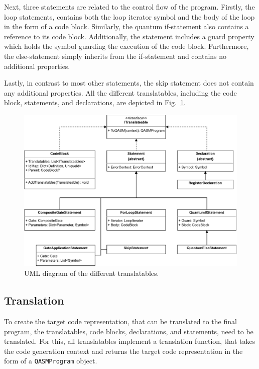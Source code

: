 Next, three statements are related to the control flow of the program. Firstly, the loop statements, contains both the loop iterator symbol and the body of the loop in the form of a code block. Similarly, the quantum if-statement also contains a reference to its code block. Additionally, the statement includes a guard property which holds the symbol guarding the execution of the code block. Furthermore, the else-statement simply inherits from the if-statement and contains no additional properties.

Lastly, in contrast to most other statements, the skip statement does not contain any additional properties. All the different translatables, including the code block, statements, and declarations, are depicted in Fig.~\ref{fig:implementation_uml_translatables}. 

\begin{figure}[htp]
    \centering
    \includegraphics[width=.9\textwidth]{../figures/uml_translateables.pdf}
    \caption{UML diagram of the different translatables.}
    \label{fig:implementation_uml_translatables}
\end{figure}

\subsection{Translation}
\label{sec:implementation_translation}
To create the target code representation, that can be translated to the final program, the translatables, \ie code blocks, declarations, and statements, need to be translated. For this, all translatables implement a translation function, that takes the code generation context and returns the target code representation in the form of a \texttt{QASMProgram} object.


